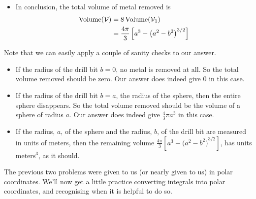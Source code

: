 \begin{eg}
\begin{itemize}
\item
In conclusion, the total volume of metal removed is
\begin{align*}
\text{Volume}(\mathcal{V})
&=8\,\text{Volume}(\mathcal{V}_1) \\
&=\frac{4\pi}{3}\left[a^3-{\big(a^2-b^2\big)}^{3/2}\right]
\end{align*}
\end{itemize}

Note that we can easily apply a couple of sanity checks to our answer.
\begin{itemize}
\item 
If the radius of the drill bit $b=0$, no metal is removed at all.
So the total volume removed should be zero. Our answer does indeed give
$0$ in this case.
\item
If the radius of the drill bit $b=a$, the radius of the sphere,
then the entire sphere disappears. So the total volume removed should 
be the volume of a sphere of radius $a$. Our answer does indeed give
$\frac{4}{3}\pi a^3$ in this case.
\item  If the radius, $a$, of the sphere and the radius, $b$, of the drill bit
are measured in units of meters, then the remaining volume 
$\frac{4\pi}{3}\left[a^3-{\big(a^2-b^2\big)}^{3/2}\right]$,
has units $\text{meters}^3$, as it should.
\end{itemize}
\end{eg}

The previous two problems were given to us (or nearly given to us)
in polar coordinates. We'll now get a little practice converting
integrals into polar coordinates, and recognising when it is helpful
to do so.

